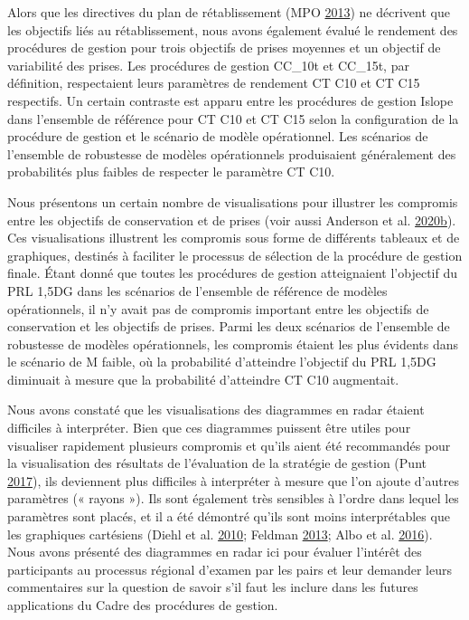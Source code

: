 \documentclass[french,11pt]{book}
\begin{document}
Alors que les directives du plan de rétablissement (MPO \protect\hyperlink{ref-dfo2013}{2013}) ne décrivent que les objectifs liés au rétablissement, nous avons également évalué le rendement des procédures de gestion pour trois objectifs de prises moyennes et un objectif de variabilité des prises. Les procédures de gestion CC\_10t et CC\_15t, par définition, respectaient leurs paramètres de rendement CT C10 et CT C15 respectifs. Un certain contraste est apparu entre les procédures de gestion Islope dans l'ensemble de référence pour CT C10 et CT C15 selon la configuration de la procédure de gestion et le scénario de modèle opérationnel. Les scénarios de l'ensemble de robustesse de modèles opérationnels produisaient généralement des probabilités plus faibles de respecter le paramètre CT C10.

Nous présentons un certain nombre de visualisations pour illustrer les compromis entre les objectifs de conservation et de prises (voir aussi Anderson et al. \protect\hyperlink{ref-anderson2020gfmp}{2020}\protect\hyperlink{ref-anderson2020gfmp}{b}). Ces visualisations illustrent les compromis sous forme de différents tableaux et de graphiques, destinés à faciliter le processus de sélection de la procédure de gestion finale. Étant donné que toutes les procédures de gestion atteignaient l'objectif du PRL 1,5DG dans les scénarios de l'ensemble de référence de modèles opérationnels, il n'y avait pas de compromis important entre les objectifs de conservation et les objectifs de prises. Parmi les deux scénarios de l'ensemble de robustesse de modèles opérationnels, les compromis étaient les plus évidents dans le scénario de M faible, où la probabilité d'atteindre l'objectif du PRL 1,5DG diminuait à mesure que la probabilité d'atteindre CT C10 augmentait.

Nous avons constaté que les visualisations des diagrammes en radar étaient difficiles à interpréter. Bien que ces diagrammes puissent être utiles pour visualiser rapidement plusieurs compromis et qu'ils aient été recommandés pour la visualisation des résultats de l'évaluation de la stratégie de gestion (Punt \protect\hyperlink{ref-punt2017}{2017}), ils deviennent plus difficiles à interpréter à mesure que l'on ajoute d'autres paramètres (« rayons »). Ils sont également très sensibles à l'ordre dans lequel les paramètres sont placés, et il a été démontré qu'ils sont moins interprétables que les graphiques cartésiens (Diehl et al. \protect\hyperlink{ref-diehl2010}{2010}; Feldman \protect\hyperlink{ref-feldman2013}{2013}; Albo et al. \protect\hyperlink{ref-albo2016}{2016}). Nous avons présenté des diagrammes en radar ici pour évaluer l'intérêt des participants au processus régional d'examen par les pairs et leur demander leurs commentaires sur la question de savoir s'il faut les inclure dans les futures applications du Cadre des procédures de gestion.
\end{document}
